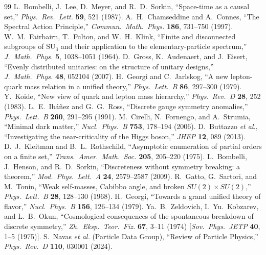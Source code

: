 \documentclass[11pt,a4paper]{article}
\theoremstyle{definition}
\theoremstyle{remark}
\begin{document}
\begin{thebibliography}{99}
 L.~Bombelli, J.~Lee, D.~Meyer, and R.~D.~Sorkin, ``Space-time as a causal set,'' \emph{Phys.\ Rev.\ Lett.} \textbf{59}, 521 (1987).
 A.~H.~Chamseddine and A.~Connes, ``The Spectral Action Principle,'' \emph{Commun.\ Math.\ Phys.} \textbf{186}, 731--750 (1997).
 W.~M.~Fairbairn, T.~Fulton, and W.~H.~Klink, ``Finite and disconnected subgroups of $\mathrm{SU}_3$ and their application to the elementary-particle spectrum,'' \emph{J.\ Math.\ Phys.} \textbf{5}, 1038--1051 (1964).
 D.~Gross, K.~Audenaert, and J.~Eisert, ``Evenly distributed unitaries: on the structure of unitary designs,'' \emph{J.\ Math.\ Phys.} \textbf{48}, 052104 (2007).
 H.~Georgi and C.~Jarlskog, ``A new lepton-quark mass relation in a unified theory,'' \emph{Phys.\ Lett.\ B} \textbf{86}, 297--300 (1979).
 Y.~Koide, ``New view of quark and lepton mass hierarchy,'' \emph{Phys.\ Rev.\ D} \textbf{28}, 252 (1983).
 L.~E.~Ib\'a\~nez and G.~G.~Ross, ``Discrete gauge symmetry anomalies,'' \emph{Phys.\ Lett.\ B} \textbf{260}, 291--295 (1991).
 M.~Cirelli, N.~Fornengo, and A.~Strumia, ``Minimal dark matter,'' \emph{Nucl.\ Phys.\ B} \textbf{753}, 178--194 (2006).
 D.~Buttazzo \emph{et al.}, ``Investigating the near-criticality of the Higgs boson,'' \emph{JHEP} \textbf{12}, 089 (2013).
 D.~J.~Kleitman and B.~L.~Rothschild, ``Asymptotic enumeration of partial orders on a finite set,'' \emph{Trans.\ Amer.\ Math.\ Soc.} \textbf{205}, 205--220 (1975).
 L.~Bombelli, J.~Henson, and R.~D.~Sorkin, ``Discreteness without symmetry breaking: a theorem,'' \emph{Mod.\ Phys.\ Lett.\ A} \textbf{24}, 2579--2587 (2009).
 R.~Gatto, G.~Sartori, and M.~Tonin, ``Weak self-masses, Cabibbo angle, and broken $SU(2) \times SU(2)$,'' \emph{Phys.\ Lett.\ B} \textbf{28}, 128--130 (1968).
 H.~Georgi, ``Towards a grand unified theory of flavor,'' \emph{Nucl.\ Phys.\ B} \textbf{156}, 126--134 (1979).
 Ya.~B.~Zeldovich, I.~Yu.~Kobzarev, and L.~B.~Okun, ``Cosmological consequences of the spontaneous breakdown of discrete symmetry,'' \emph{Zh.\ Eksp.\ Teor.\ Fiz.} \textbf{67}, 3--11 (1974) [\emph{Sov.\ Phys.\ JETP} \textbf{40}, 1--5 (1975)].
 S.~Navas \emph{et al.} (Particle Data Group), ``Review of Particle Physics,'' \emph{Phys.\ Rev.\ D} \textbf{110}, 030001 (2024).
\end{thebibliography}
\end{document}
